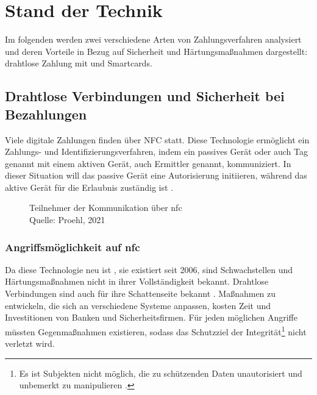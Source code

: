 \section{Stand der Technik}

Im folgenden werden zwei verschiedene Arten von Zahlungsverfahren analysiert und deren
Vorteile in Bezug auf Sicherheit und Härtungsmaßnahmen dargestellt: drahtlose Zahlung mit und 
Smartcards.

\subsection{Drahtlose Verbindungen und Sicherheit bei Bezahlungen}

Viele digitale Zahlungen finden über NFC statt. Diese Technologie ermöglicht ein Zahlungs- und
Identifizierungsverfahren, indem ein passives Gerät oder auch Tag genannt mit einem aktiven Gerät,
auch Ermittler genannt, kommuniziert. In dieser Situation will das passive Gerät eine Autorisierung initiieren,
während das aktive Gerät für die Erlaubnis zuständig ist \cite{refart:NFNK}. 

\begin{figure}[H]
   \caption{Teilnehmer der Kommunikation über \acrshort{nfc}\\Quelle: Proehl, 2021}
   \label{fig:refart_GPIN}
\end{figure}

\subsubsection{Angriffsmöglichkeit auf \acrshort{nfc}}

Da diese Technologie neu ist \cite{refip:NTAS}, sie existiert seit 2006, sind Schwachstellen 
und Härtungsmaßnahmen nicht in ihrer Vollständigkeit bekannt. Drahtlose Verbindungen sind auch für ihre 
Schattenseite bekannt \cite{refip:NYRS}. Maßnahmen zu entwickeln, die sich an verschiedene Systeme anpassen,
kosten Zeit und Investitionen von Banken und Sicherheitsfirmen. Für jeden möglichen Angriffe müssten 
Gegenmaßnahmen existieren, sodass das Schutzziel der Integrität\footnote{Es ist Subjekten nicht möglich, 
die zu schützenden Daten unautorisiert und unbemerkt zu manipulieren \cite{refbook:SWIS}.} nicht verletzt wird.

